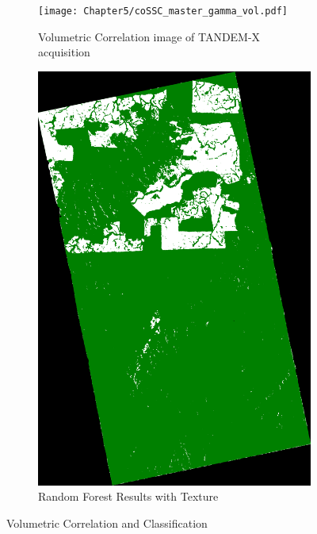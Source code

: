 \begin{figure}[H]
  \centering
  \begin{subfigure}[b]{0.4\linewidth}
    \texttt{[image: Chapter5/coSSC\_master\_gamma\_vol.pdf]}
     \caption{Volumetric Correlation image of TANDEM-X acquisition}
  \end{subfigure}
  \begin{subfigure}[b]{0.4\linewidth}
    \includegraphics[width=\linewidth]{Chapter5/TANDEM-X/classification_resultsimage.pdf}
    \caption{Random Forest Results with Texture}
  \end{subfigure}
  \caption{Volumetric Correlation and Classification}
  \label{fig:classification_tandem}
\end{figure}

